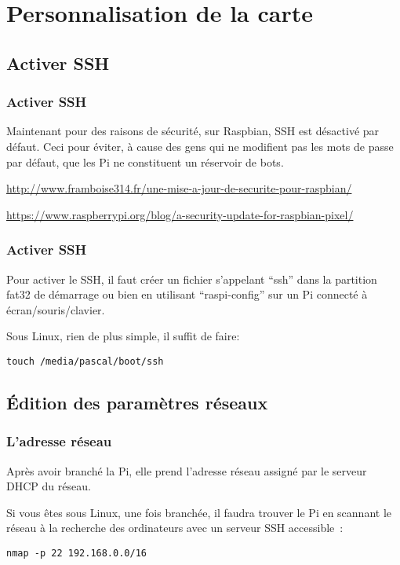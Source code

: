 \section{Personnalisation de la carte}

\subsection{Activer SSH}

\begin{frame}[containsverbatim]
\frametitle{Activer SSH}
Maintenant pour des raisons de sécurité, sur Raspbian, SSH est désactivé par défaut. Ceci pour éviter, à cause des gens qui ne modifient pas les mots de passe par défaut, que les Pi ne constituent un réservoir de bots.

\href{http://www.framboise314.fr/une-mise-a-jour-de-securite-pour-raspbian/}{http://www.framboise314.fr/une-mise-a-jour-de-securite-pour-raspbian/}


\href{https://www.raspberrypi.org/blog/a-security-update-for-raspbian-pixel/}{https://www.raspberrypi.org/blog/a-security-update-for-raspbian-pixel/}

\end{frame}

\begin{frame}[containsverbatim]
\frametitle{Activer SSH}

Pour activer le SSH, il faut créer un fichier s'appelant ``ssh'' dans la partition fat32 de démarrage ou bien en utilisant ``raspi-config'' sur un Pi connecté à écran/souris/clavier.

Sous Linux, rien de plus simple, il suffit de faire:
\begin{verbatim}
touch /media/pascal/boot/ssh
\end{verbatim}

\end{frame}


\subsection{\'Edition des paramètres réseaux}

\begin{frame}[containsverbatim]
\frametitle{L'adresse réseau}

Après avoir branché la Pi, elle prend l'adresse réseau assigné par le serveur DHCP du réseau.

Si vous êtes sous Linux, une fois branchée, il faudra trouver le Pi en scannant le réseau à la recherche des ordinateurs avec un serveur SSH accessible~:
\begin{verbatim}
nmap -p 22 192.168.0.0/16
\end{verbatim}
\end{frame}

